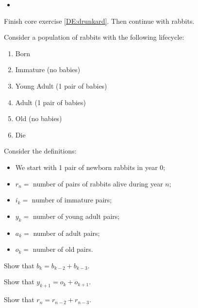 	
\bookonlynewpage

\hfill

\bookonlynewpage



\begin{lesson}


	\begin{itemize}
		\item 
	\end{itemize}
	

Finish core exercise \ref{DE:drunkard}.
Then continue with rabbits.

\end{lesson}


\begin{minipage}{.45\textwidth}
\question \label{rabbitscomplicatedproof}
	Consider a population of rabbits with the following lifecycle:
	\begin{enumerate}[start=0,label=(year \arabic*)]
		\item Born
		\item Immature (no babies)
		\item Young Adult (1 pair of babies)
		\item Adult (1 pair of babies)
		\item Old (no babies)
		\item Die \\[5pt]
	\end{enumerate}	
	
\end{minipage}
\qquad
\begin{minipage}{.45\textwidth}
	Consider the definitions:
	\begin{itemize}
		\item We start with 1 pair of newborn rabbits in year 0;
		\item $r_n=$ number of pairs of rabbits alive during year $n$;
		\item $i_k=$ number of immature pairs;
		\item $y_k=$ number of young adult pairs;
		\item $a_k=$ number of adult pairs;
		\item $o_k=$ number of old pairs.
	\end{itemize}

\end{minipage}

	\begin{parts}
		\item Show that $b_k=b_{k-2}+b_{k-3}$.
		\item Show that $y_{k+1}=o_{k}+o_{k+1}$.
		\item Show that $r_{n} = r_{n-2}+r_{n-3}$.
	\end{parts}

